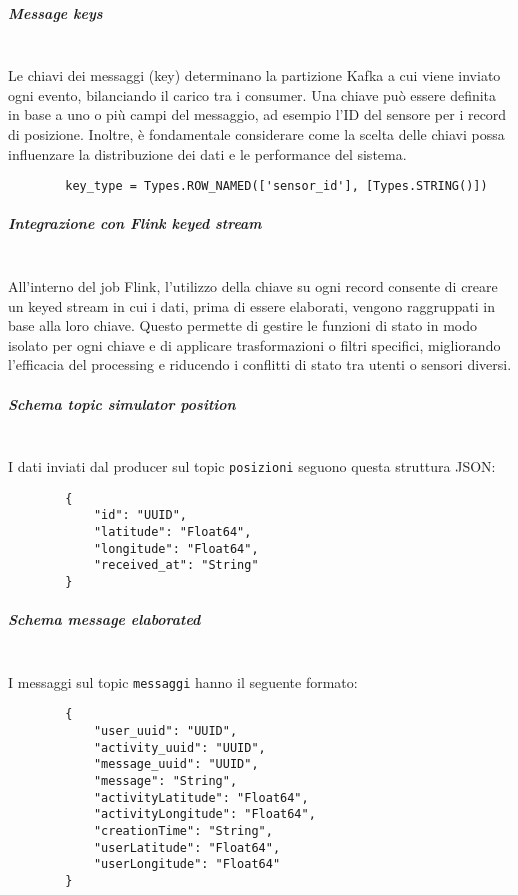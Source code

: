 \documentclass[10pt]{article}
\newcommand{\mysubparagraph}[1]{\subparagraph{#1}\mbox{}\\}
\begin{document}
        \mysubparagraph{Message keys}
        Le chiavi dei messaggi (key) determinano la partizione Kafka a cui viene inviato ogni evento, bilanciando il carico tra i consumer. Una chiave può essere definita in base a uno o più campi del messaggio, ad esempio l'ID del sensore per i record di posizione. Inoltre, è fondamentale considerare come la scelta delle chiavi possa influenzare la distribuzione dei dati e le performance del sistema.
        \begin{lstlisting}
        key_type = Types.ROW_NAMED(['sensor_id'], [Types.STRING()])
        \end{lstlisting}

        \mysubparagraph{Integrazione con Flink keyed stream}
        All’interno del job Flink, l'utilizzo della chiave su ogni record consente di creare un keyed stream
        in cui i dati, prima di essere elaborati, vengono raggruppati in base alla loro chiave. Questo permette
        di gestire le funzioni di stato in modo isolato per ogni chiave e di applicare trasformazioni o filtri
        specifici, migliorando l’efficacia del processing e riducendo i conflitti di stato tra utenti o sensori
        diversi.

        \mysubparagraph{Schema topic simulator position}
        I dati inviati dal producer sul topic \texttt{posizioni} seguono questa struttura JSON: \\
        \begin{lstlisting}
        {
            "id": "UUID",
            "latitude": "Float64",
            "longitude": "Float64",
            "received_at": "String"
        }
        \end{lstlisting}

        \mysubparagraph{Schema message elaborated}
        I messaggi sul topic \texttt{messaggi} hanno il seguente formato: \\
        \begin{lstlisting}
        {
            "user_uuid": "UUID",
            "activity_uuid": "UUID",
            "message_uuid": "UUID",
            "message": "String",
            "activityLatitude": "Float64",
            "activityLongitude": "Float64",
            "creationTime": "String",
            "userLatitude": "Float64",
            "userLongitude": "Float64"
        }
        \end{lstlisting}
\end{document}

